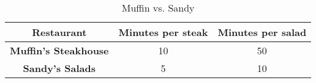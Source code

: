 \begin{table}
  \begin{tabular}{|c|c|c|}
    \hline
    \textbf{Restaurant} & \textbf{Minutes per steak} & \textbf{Minutes per salad} \\
    \hline
    \textbf{Muffin's Steakhouse} & 10 & 50 \\
    \hline
    \textbf{Sandy's Salads} & 5 & 10 \\
    \hline
  \end{tabular}
  \caption{Muffin vs. Sandy}
\end{table}